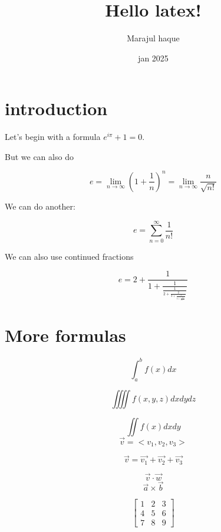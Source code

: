 \documentclass{article}
\title{Hello latex!}
\author{Marajul haque}
\date{jan 2025}
\begin{document}
	
	\maketitle
	
	\section*{introduction}
	
	Let's begin with a formula $e^{i\pi}+1=0$. 
	


	
	But we can also do 
	
	$$  e=\lim_{n\to\infty}  \left(1+\frac{1}{n}\right)^n = \lim_{n\to\infty}\frac{n}{\sqrt{n!}}$$
	
	We can do another:
	
	$$ e=\sum_{n=0}^{\infty} \frac{1}{n!} $$
	
	
	We can also use continued fractions
	
	$$ e=2+\frac{1}{1+\frac{1}{\frac{1}{2+\frac{2}{3+\frac{3}{4+\frac{4}{5+\ddots}}}}}}$$
	

	
\section{More formulas}
	
	
	$$\int_a^bf(x)dx$$
	
	$$  \iiiint f(x,y,z)dxdydz	$$
	
	$$ \iint f(x)dxdy$$
	$$\vec{v}=<v_1, v_2, v_3>  $$
	
	$$\vec{v}=\vec{v_1}+\vec{v_2}+\vec{v_3}$$
	
	$$\vec{v}\cdot\vec{w}$$
	$$ \vec{a}\times \vec{b}$$
	
	$$\begin{bmatrix} 
	
	1&2&3\\
	4&5&6\\ 
	7&8&9
	
	\end{bmatrix}
$$	



	
\end{document}
